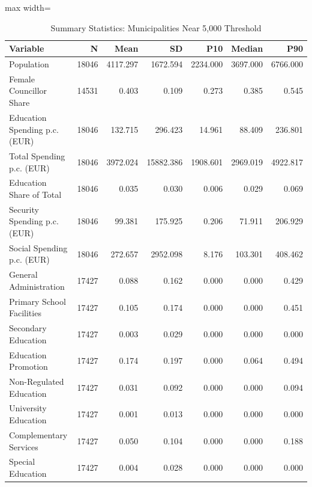 \begin{table}[!h]
\centering
\small
\centering
\caption{\label{tab:summary}Summary Statistics: Municipalities Near 5,000 Threshold}
\centering
\begin{adjustbox}{max width=\textwidth}
\begin{tabular}[t]{lrrrrrr}
\toprule
Variable & N & Mean & SD & P10 & Median & P90\\
\midrule
Population & 18046 & 4117.297 & 1672.594 & 2234.000 & 3697.000 & 6766.000\\
Female Councillor Share & 14531 & 0.403 & 0.109 & 0.273 & 0.385 & 0.545\\
Education Spending p.c. (EUR) & 18046 & 132.715 & 296.423 & 14.961 & 88.409 & 236.801\\
Total Spending p.c. (EUR) & 18046 & 3972.024 & 15882.386 & 1908.601 & 2969.019 & 4922.817\\
Education Share of Total & 18046 & 0.035 & 0.030 & 0.006 & 0.029 & 0.069\\
\addlinespace
Security Spending p.c. (EUR) & 18046 & 99.381 & 175.925 & 0.206 & 71.911 & 206.929\\
Social Spending p.c. (EUR) & 18046 & 272.657 & 2952.098 & 8.176 & 103.301 & 408.462\\
General Administration & 17427 & 0.088 & 0.162 & 0.000 & 0.000 & 0.429\\
Primary School Facilities & 17427 & 0.105 & 0.174 & 0.000 & 0.000 & 0.451\\
Secondary Education & 17427 & 0.003 & 0.029 & 0.000 & 0.000 & 0.000\\
\addlinespace
Education Promotion & 17427 & 0.174 & 0.197 & 0.000 & 0.064 & 0.494\\
Non-Regulated Education & 17427 & 0.031 & 0.092 & 0.000 & 0.000 & 0.094\\
University Education & 17427 & 0.001 & 0.013 & 0.000 & 0.000 & 0.000\\
Complementary Services & 17427 & 0.050 & 0.104 & 0.000 & 0.000 & 0.188\\
Special Education & 17427 & 0.004 & 0.028 & 0.000 & 0.000 & 0.000\\
\bottomrule
\end{tabular}
\end{adjustbox}
\end{table}
